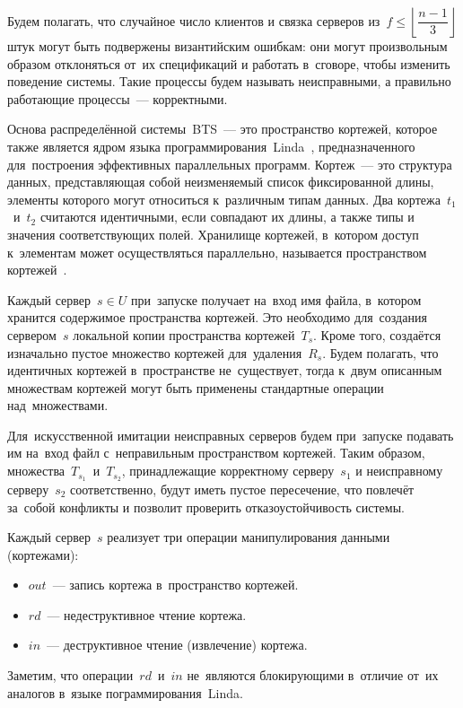 Будем полагать, что случайное число клиентов и связка серверов из~$f \leqslant \left\lfloor \dfrac{n-1}{3} \right\rfloor$ штук могут быть подвержены византийским ошибкам: они могут произвольным образом отклоняться от~их спецификаций и работать в~сговоре, чтобы изменить поведение системы. Такие процессы будем называть неисправными, а правильно работающие процессы~--- корректными.

Основа распределённой системы~BTS~--- это пространство кортежей, которое также является ядром языка программирования~Linda~\autocite{linda}, предназначенного для~построения эффективных параллельных программ. Кортеж~--- это структура данных, представляющая собой неизменяемый список фиксированной длины, элементы которого могут относиться к~различным типам данных. Два кортежа~$t_1$~и~$t_2$ считаются идентичными, если совпадают их длины, а также типы и значения соответствующих полей. Хранилище кортежей, в~котором доступ к~элементам может осуществляться параллельно, называется пространством кортежей~\autocite{tuplespace}.

Каждый сервер~$s \in U$ при~запуске получает на~вход имя файла, в~котором хранится содержимое пространства кортежей. Это необходимо для~создания сервером~$s$ локальной копии пространства кортежей~$T_s$. Кроме того, создаётся изначально пустое множество кортежей для~удаления~$R_s$. Будем полагать, что идентичных кортежей в~пространстве не~существует, тогда к~двум описанным множествам кортежей могут быть применены стандартные операции над~множествами.

Для~искусственной имитации неисправных серверов будем при~запуске подавать им на~вход файл с~неправильным пространством кортежей. Таким образом, множества~$T_{s_1}$~и~$T_{s_2}$, принадлежащие корректному серверу~$s_1$ и неисправному серверу~$s_2$ соответственно, будут иметь пустое пересечение, что повлечёт за~собой конфликты и позволит проверить отказоустойчивость системы.

Каждый сервер~$s$ реализует три операции манипулирования данными (кортежами):
\begin{itemize}
	\item $out$~--- запись кортежа в~пространство кортежей.
	\item $rd$~--- недеструктивное чтение кортежа.
	\item $in$~--- деструктивное чтение (извлечение) кортежа.
\end{itemize}
Заметим, что операции~$rd$~и~$in$ не~являются блокирующими в~отличие от~их аналогов в~языке пограммирования~Linda.

